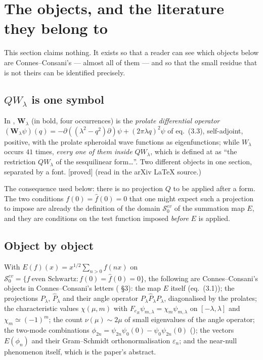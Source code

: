 \documentclass[11pt,a4paper]{article}
\theoremstyle{plain}
\theoremstyle{definition}
\theoremstyle{remark}
\newcommand{\st}[1]{{\normalfont\sffamily\footnotesize[#1]}}
\newcommand{\proved}{\st{proved}}
\newcommand{\R}{\mathbb{R}}
\newcommand{\Z}{\mathbb{Z}}
\newcommand{\Q}{\mathbb{Q}}
\newcommand{\A}{\mathbb{A}}
\newcommand{\E}{\mathcal{E}}
\newcommand{\F}{\mathcal{F}}
\newcommand{\QW}{QW}
\newcommand{\file}[1]{\path{#1}}
\def\QW{QW}\def\E{E}\def\F{F}\def\R{R}\def\Q{Q}\def\Z{Z}\def\A{A}%
\begin{document}
\section{The objects, and the literature they belong to}
\label{sec:objects}

This section claims nothing.  It exists so that a reader can see which objects
below are Connes--Consani's --- almost all of them --- and so that the small
residue that is not theirs can be identified precisely.

\subsection{\texorpdfstring{$\QW_\lambda$}{QW-lambda} is one symbol}
\label{sec:onesymbol}

In \cite{CC2023}, $\mathbf{W}_\lambda$ (in bold, four occurrences) is the
\emph{prolate differential operator}
$(\mathbf{W}_\lambda\psi)(q)=-\partial((\lambda^2-q^2)\partial)\psi+(2\pi\lambda q)^2\psi$
of eq.\ (3.3), self-adjoint, positive, with the prolate spheroidal wave
functions as eigenfunctions; while $W_\lambda$ occurs $41$ times, \emph{every
one of them inside} $\QW_\lambda$, which is defined at \file{:169} as ``the
restriction $\QW_\lambda$ of the sesquilinear form\ldots''.  Two different
objects in one section, separated by a font. \proved{} (read in the arXiv \LaTeX{}
source.)

The consequence used below: there is no projection $Q$ to be applied after a
form.  The two conditions $f(0)=\widehat f(0)=0$ that one might expect such a
projection to impose are already the definition of the domain
$\mathcal S_0^{ev}$ of the summation map $\E$, and they are conditions on the
test function imposed \emph{before} $\E$ is applied.

\subsection{Object by object}

With $\E(f)(x)=x^{1/2}\sum_{n>0}f(nx)$ on
$\mathcal S_0^{ev}=\{f\ \text{even Schwartz}:f(0)=\widehat f(0)=0\}$, the
following are Connes--Consani's objects in Connes--Consani's letters
(\cite{CC2023} \S3): the map $\E$ itself (eq.\ (3.1)); the projections
$P_\lambda$, $\widehat P_\lambda$ and their angle operator
$P_\lambda\widehat P_\lambda P_\lambda$, diagonalised by the prolates; the
characteristic values $\chi(\mu,m)$ with
$\F_{e_\R}\psi_{m,\lambda}=\chi_m\psi_{m,\lambda}$ on $[-\lambda,\lambda]$ and
$\chi_m\simeq(-1)^m$; the count $\nu(\mu)\sim2\mu$ of small eigenvalues of the
angle operator; the two-mode combinations
$\phi_{2n}=\psi_{2n}\psi_0(0)-\psi_0\psi_{2n}(0)$ (\file{:744}); the vectors
$\E(\phi_n)$ and their Gram--Schmidt orthonormalisation $\varepsilon_n$; and the
near-null phenomenon itself, which is the paper's abstract.
\end{document}
